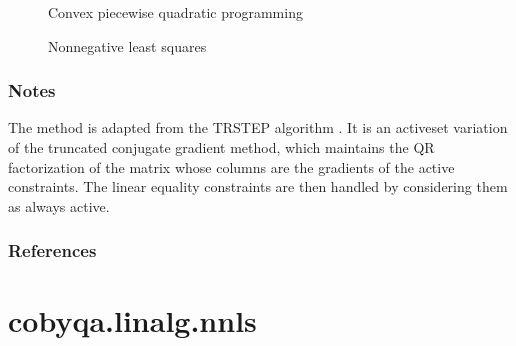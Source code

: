 \documentclass[letterpaper,10pt,english]{sphinxmanual}
\begin{document}
\begin{fulllineitems}
\begin{description}
\item[{{\hyperref[\detokenize{refs/generated/cobyqa.linalg.cpqp:cobyqa.linalg.cpqp}]{}}}] \leavevmode
\sphinxAtStartPar
Convex piecewise quadratic programming

\item[{{\hyperref[\detokenize{refs/generated/cobyqa.linalg.nnls:cobyqa.linalg.nnls}]{}}}] \leavevmode
\sphinxAtStartPar
Nonnegative least squares

\end{description}


\subsubsection*{Notes}

\sphinxAtStartPar
The method is adapted from the TRSTEP algorithm . It is an active\sphinxhyphen{}set
variation of the truncated conjugate gradient method, which maintains the QR
factorization of the matrix whose columns are the gradients of the active
constraints. The linear equality constraints are then handled by considering
them as always active.
\subsubsection*{References}

\sphinxAtStartPar
{}

\end{fulllineitems}



\section{cobyqa.linalg.nnls}
\label{\detokenize{refs/generated/cobyqa.linalg.nnls:cobyqa-linalg-nnls}}\label{\detokenize{refs/generated/cobyqa.linalg.nnls::doc}}
\end{document}
